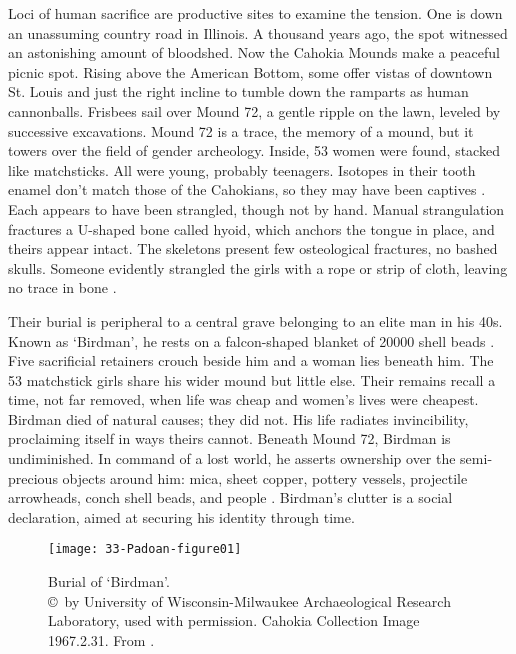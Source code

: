 Loci of human sacrifice are productive sites to examine the tension. One is down an unassuming country road in Illinois. A thousand years ago, the spot witnessed an astonishing amount of bloodshed. Now the Cahokia Mounds make a peaceful picnic spot. Rising above the American Bottom, some offer vistas of downtown St. Louis and just the right incline to tumble down the ramparts as human cannonballs. Frisbees sail over Mound 72, a gentle ripple on the lawn, leveled by successive excavations. Mound 72 is a trace, the memory of a mound, but it towers over the field of gender archeology. Inside, 53 women were found, stacked like matchsticks. All were young, probably teenagers. Isotopes in their tooth enamel don't match those of the Cahokians, so they may have been captives \parencite[]{thompson2013}. Each appears to have been strangled, though not by hand. Manual strangulation fractures a U-shaped bone called hyoid, which anchors the tongue in place, and theirs appear intact. The skeletons present few osteological fractures, no bashed skulls. Someone evidently strangled the girls with a rope or strip of cloth, leaving no trace in bone \parencite[168]{benson2001}. 

Their burial is peripheral to a central grave belonging to an elite man in his 40s. Known as \enquote*{Birdman}, he rests on a falcon-shaped blanket of \num{20000} shell beads . Five sacrificial retainers crouch beside him and a woman lies beneath him. The 53 matchstick girls share his wider mound but little else. Their remains recall a time, not far removed, when life was cheap and women's lives were cheapest. Birdman died of natural causes; they did not. His life radiates invincibility, proclaiming itself in ways theirs cannot. Beneath Mound 72, Birdman is undiminished. In command of a lost world, he asserts ownership over the semi-precious objects around him: mica, sheet copper, pottery vessels, projectile arrowheads, conch shell beads, and people \parencite[3--8]{fowler1999}. Birdman's clutter is a social declaration, aimed at securing his identity through time.

\begin{figure}[!htb]
	\texttt{[image: 33-Padoan-figure01]}
	\caption{Burial of \enquote*{Birdman}.
		{\normalfont\scriptsize \\ \copyright\ by University of Wisconsin-Milwaukee Archaeological Research Laboratory, used with permission. Cahokia Collection Image 1967.2.31. From \textcite[]{fowler1991}.
	}}
	\label{fig:33-Padoan-figure01}
\end{figure}

